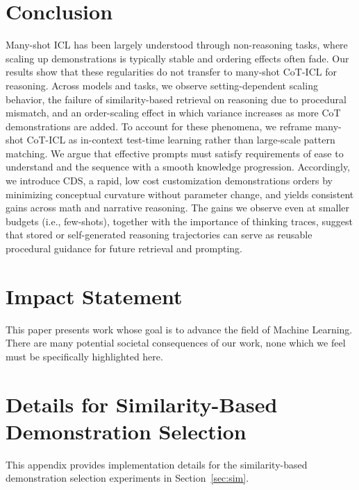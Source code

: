 \documentclass{article}
\theoremstyle{plain}
\theoremstyle{definition}
\theoremstyle{remark}
\begin{document}
\section{Conclusion}
Many-shot ICL has been largely understood through non-reasoning tasks, where scaling up demonstrations is typically stable and ordering effects often fade.
Our results show that these regularities do not transfer to many-shot CoT-ICL for reasoning.
Across models and tasks, we observe setting-dependent scaling behavior, the failure of similarity-based retrieval on reasoning due to procedural mismatch, and an order-scaling effect in which variance increases as more CoT demonstrations are added. To account for these phenomena, we reframe many-shot CoT-ICL as in-context test-time learning rather than large-scale pattern matching.
We argue that effective prompts must satisfy requirements of ease to understand and the sequence with a smooth knowledge progression.
Accordingly, we introduce CDS, a rapid, low cost customization demonstrations orders by minimizing conceptual curvature without parameter change, and yields consistent gains across math and narrative reasoning. The gains we observe even at smaller budgets (i.e., few-shots), together with the importance of thinking traces, suggest that stored or self-generated reasoning trajectories can serve as reusable procedural guidance for future retrieval and prompting.



\section*{Impact Statement}
This paper presents work whose goal is to advance the field of Machine
Learning. There are many potential societal consequences of our work, none
which we feel must be specifically highlighted here.





\nocite{langley00}




\clearpage
\appendix



\section{Details for Similarity-Based Demonstration Selection}
\label{sec:sim_setup}

This appendix provides implementation details for the similarity-based demonstration selection experiments in Section~\ref{sec:sim}.
\end{document}

